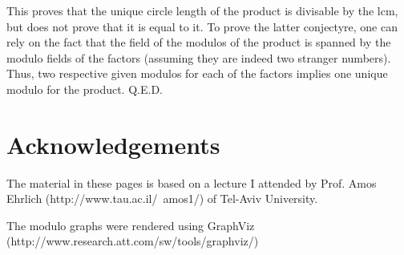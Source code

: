 \documentclass[a4paper]{report}
\begin{document}
This proves that the unique circle length of the product is divisable by the
lcm, but does not prove that it is equal to it. To prove the latter
conjectyre, one can rely on the fact that the field of the modulos of
the product is spanned by the modulo fields of the factors (assuming
they are indeed two stranger numbers). Thus, two respective given
modulos for each of the factors implies one unique modulo for the
product. Q.E.D.

\section{Acknowledgements}

The material in these pages is based on a lecture I attended by
Prof. Amos Ehrlich (http://www.tau.ac.il/~amos1/) of Tel-Aviv University.

The modulo graphs were rendered using GraphViz
(http://www.research.att.com/sw/tools/graphviz/)
\end{document}
